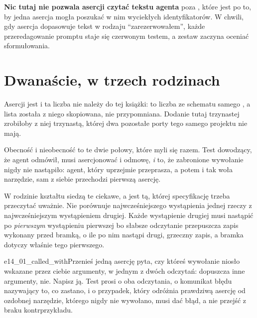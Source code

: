 \textbf{Nic tutaj nie pozwala asercji czytać tekstu agenta} poza
, które jest po to, by jedna asercja mogła poszukać w nim
wyciekłych identyfikatorów. W chwili, gdy asercja dopasowuje tekst w rodzaju
\enquote{zarezerwowałem}, każde przeredagowanie promptu staje się
czerwonym testem, a zestaw zaczyna oceniać sformułowania.

\section{Dwanaście, w trzech rodzinach}
\label{sec:ch14-twelve}

Asercji jest  i ta liczba nie należy do tej książki:
to liczba ze schematu samego , a lista została z
niego skopiowana, nie przypomniana. Dodanie tutaj trzynastej zrobiłoby z
niej trzynastą, której dwa pozostałe porty tego samego projektu nie mają.


\noindent
Obecność i nieobecność to te dwie połowy, które myli się razem. Test
dowodzący, że agent odmówił, musi asercjonować i odmowę, \emph{i} to, że
zabronione wywołanie nigdy nie nastąpiło: agent, który uprzejmie przeprasza,
a potem i tak woła narzędzie, sam z siebie przechodzi pierwszą asercję.


\noindent
W rodzinie kształtu siedzą te ciekawe, a  jest tą, której
specyfikację trzeba przeczytać uważnie. Nie porównuje najwcześniejszego
wystąpienia jednej rzeczy z najwcześniejszym wystąpieniem drugiej. Każde
wystąpienie drugiej musi nastąpić po \emph{pierwszym} wystąpieniu
pierwszej \dash{} bo słabsze odczytanie przepuszcza zapis wykonany przed
bramką, o ile po nim nastąpi drugi, grzeczny zapis, a bramka dotyczy
właśnie tego pierwszego.


\begin{exercise}{e14_01_called_with}{Przenieś jedną asercję}
 pyta, czy któreś wywołanie niosło wskazane przez
ciebie argumenty, w jednym z dwóch odczytań:  dopuszcza inne
argumenty,  nie. Napisz ją. Test prosi o oba odczytania, o
komunikat błędu nazywający to, co zastano, i o przypadek, który odróżnia
prawdziwą asercję od ozdobnej \dash{} narzędzie, którego nigdy nie
wywołano, musi dać błąd, a nie przejść z braku kontrprzykładu.
\end{exercise}


